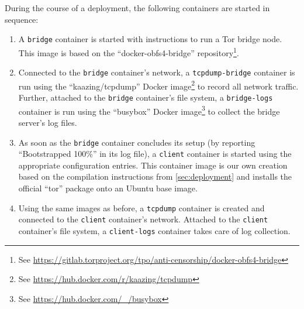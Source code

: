 During the course of a deployment, the following containers are started in sequence:
\begin{enumerate}
    \item A \texttt{bridge} container is started with instructions to run a Tor bridge node. This image is based on the ``docker-obfs4-bridge'' repository\footnote{See \url{https://gitlab.torproject.org/tpo/anti-censorship/docker-obfs4-bridge}}.
    \item Connected to the \texttt{bridge} container's network, a \texttt{tcpdump-bridge} container is run using the ``kaazing/tcpdump'' Docker image\footnote{See \url{https://hub.docker.com/r/kaazing/tcpdump}} to record all network traffic.\\
    Further, attached to the \texttt{bridge} container's file system, a \texttt{bridge-logs} container is run using the ``busybox'' Docker image\footnote{See \url{https://hub.docker.com/_/busybox}} to collect the bridge server's log files.
    \item As soon as the \texttt{bridge} container concludes its setup (by reporting ``Bootstrapped 100\%'' in its log file), a \texttt{client} container is started using the appropriate configuration entries. This container image is our own creation based on the compilation instructions from \cref{sec:deployment} and installs the official ``tor'' package onto an Ubuntu base image.
    \item Using the same images as before, a \texttt{tcpdump} container is created and connected to the \texttt{client} container's network. Attached to the \texttt{client} container's file system, a \texttt{client-logs} container takes care of log collection.
\end{enumerate}

